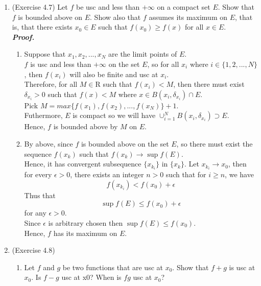 \documentclass[a4paper,11pt]{article}
\begin{document}
\begin{enumerate}
\newpage



\item (Exercise 4.7)
Let $f$ be usc and less than $+\infty$ on a compact set $E$. Show that $f$ is bounded above on $E$. Show also that $f$ assumes its maximum on $E$, that is, that there exists $x_0 \in E$ such that $f(x_0) \geq f(x)$ for all $x \in E$.\\
\newline
\textit{\textbf {Proof.}}

\begin{enumerate}
\item
Suppose that $x_1, x_2, ..., x_N$ are the limit points of $E$.\\
$f$ is usc and less than $+\infty$ on the set $E$, so for all $x_i$ where $i \in \{ 1,2,...,N \}$, then $f(x_i)$ will also be finite and usc at $x_i$.\\
Therefore, for all $M \in \mathrm{R}$ such that $f(x_i) < M$, then there must exist $\delta_{x_i} > 0$ such that $f(x) < M$ where $x \in  B(x_i, \delta_{x_i}) \cap E$.\\
Pick $M = max \{ f(x_1), f(x_2), ..., f(x_N) \} + 1$.\\
Futhermore, $E$ is compact so we will have $\cup_{i=1}^{N} B(x_i, \delta_{x_i}) \supset E$.\\
Hence, $f$ is bounded above by $M$ on $E$.

\item
By above, since $f$ is bounded above on the set $E$, so there must exist the sequence {$f(x_k)$} such that $f(x_k) \to \sup f(E)$.\\
Hence, it has convergent subsequence $\{ x_{k_i} \}$ in $\{ x_k \}$. Let $x_{k_i} \to x_0$, then for every $\epsilon > 0$, there exists an integer $n > 0$ such that for $i \geq n$, we have
$$f(x_{k_i}) < f(x_0) + \epsilon$$
Thus that
$$\sup f(E) \leq f(x_0) + \epsilon$$
for any $\epsilon > 0$.\\
Since $\epsilon$ is arbitrary chosen then $\sup f(E) \leq f(x_0)$.\\
Hence, $f$ has its maximum on $E$.\\
\end{enumerate}





\item (Exercise 4.8)
\begin{enumerate}

\item  Let $f$ and $g$ be two functions that are usc at $x_0$. Show that $f+g$ is usc at $x_0$. Is $f-g$ usc at x0? When is $fg$ usc at $x_0$?


\end{enumerate}
\end{enumerate}
\end{document}
